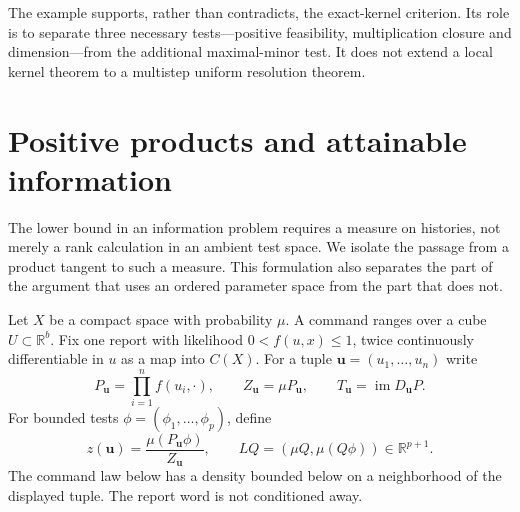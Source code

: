 \documentclass[11pt]{amsart}
\theoremstyle{definition}\newtheorem{definition}[theorem]{Definition}
\theoremstyle{remark}\newtheorem{remark}[theorem]{Remark}
\newcommand{\R}{\mathbb R}\newcommand{\N}{\mathbb N}\newcommand{\C}{\mathbb C}
\begin{document}
The example supports, rather than contradicts, the exact-kernel
criterion. Its role is to separate three necessary tests---positive
feasibility, multiplication closure and dimension---from the additional
maximal-minor test. It does not extend a local kernel theorem to a
multistep uniform resolution theorem.

\section{Positive products and attainable information}
\label{sec:positive-history}
The lower bound in an information problem requires a measure on histories,
not merely a rank calculation in an ambient test space. We isolate the
passage from a product tangent to such a measure. This formulation also
separates the part of the argument that uses an ordered parameter space
from the part that does not.

Let $X$ be a compact space with probability $\mu$. A command ranges over
a cube $U\subset\R^b$. Fix one report with likelihood $0<f(u,x)\le1$, twice
continuously differentiable in $u$ as a map into $C(X)$. For a tuple
$\boldsymbol u=(u_1,\ldots,u_n)$ write
\[
 P_{\boldsymbol u}=\prod_{i=1}^nf(u_i,\cdot),\qquad
 Z_{\boldsymbol u}=\mu P_{\boldsymbol u},\qquad
 T_{\boldsymbol u}=\operatorname{im}D_{\boldsymbol u}P.
\]
For bounded tests $\phi=(\phi_1,\ldots,\phi_p)$, define
\[
 z(\boldsymbol u)=\frac{\mu(P_{\boldsymbol u}\phi)}{Z_{\boldsymbol u}},
 \qquad LQ=(\mu Q,\mu(Q\phi))\in\R^{p+1}.
\]
The command law below has a density bounded below on a neighborhood of
the displayed tuple. The report word is not conditioned away.
\end{document}
